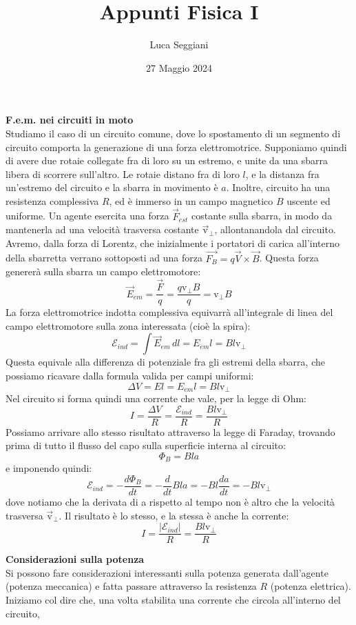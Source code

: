 \documentclass[a4paper,12pt]{article}
\title{Appunti Fisica I}
\author{Luca Seggiani}
\date{27 Maggio 2024}
\begin{document}
\maketitle
\par\smallskip
\textbf{F.e.m. nei circuiti in moto} \\
Studiamo il caso di un circuito comune, dove lo spostamento di un segmento di circuito comporta la generazione di una forza elettromotrice. Supponiamo quindi di avere due rotaie collegate fra di loro su un estremo,
e unite da una sbarra libera di scorrere sull'altro. Le rotaie distano fra di loro $l$, e la distanza fra un'estremo del circuito e la sbarra in movimento è $a$. Inoltre, circuito ha una resistenza complessiva $R$, 
ed è immerso in un campo magnetico $B$ uscente ed uniforme. Un agente esercita una forza $\vec{F}_{est}$ costante sulla sbarra, in modo da mantenerla ad una velocità trasversa costante $\vec{\mathrm{v}}_\perp$, allontanandola dal circuito.
Avremo, dalla forza di Lorentz, che inizialmente i portatori di carica all'interno della sbarretta verrano sottoposti ad una forza $\vec{F_B} = q\vec{V} \times \vec{B}$. Questa forza genererà sulla sbarra un campo elettromotore:
$$ \vec{E}_{em} = \frac{\vec{F}}{q} = \frac{q\mathrm{v}_\perp B}{q} = \mathrm{v}_\perp B $$
La forza elettromotrice indotta complessiva equivarrà all'integrale di linea del campo elettromotore sulla zona interessata (cioè la spira):
$$ \mathcal{E}_{ind} = \int \vec{E}_{em} \, dl = E_{em} l = B l \mathrm{v}_\perp $$
Questa equivale alla differenza di potenziale fra gli estremi della sbarra, che possiamo ricavare dalla formula valida per campi uniformi:
$$ \Delta V = E l = E_{em} l = B l \mathrm{v}_\perp$$
Nel circuito si forma quindi una corrente che vale, per la legge di Ohm:
$$ I = \frac{\Delta V}{R} = \frac{\mathcal{E}_{ind}}{R} = \frac{Bl \mathrm{v}_\perp}{R} $$
Possiamo arrivare allo stesso risultato attraverso la legge di Faraday, trovando prima di tutto il flusso del capo sulla superficie interna al circuito:
$$ \Phi_B = Bla $$
e imponendo quindi:
$$ \mathcal{E}_{ind} = -\frac{d\Phi_B}{dt} = -\frac{d}{dt} Bla = -Bl \frac{da}{dt} = -Bl\mathrm{v}_\perp $$
dove notiamo che la derivata di a rispetto al tempo non è altro che la velocità trasversa $\vec{\mathrm{v}}_\perp$.  Il risultato è lo stesso, e la stessa è anche la corrente:
$$ I =\frac{|\mathcal{E}_{ind}|}{R} = \frac{Bl\mathrm{v}_\perp}{R} $$
\par\smallskip
\textbf{Considerazioni sulla potenza} \\
Si possono fare considerazioni interessanti sulla potenza generata dall'agente (potenza meccanica) e fatta passare attraverso la resistenza $R$ (potenza elettrica). Iniziamo col dire che, una volta stabilita una corrente che circola all'interno del circuito,
\end{document}
